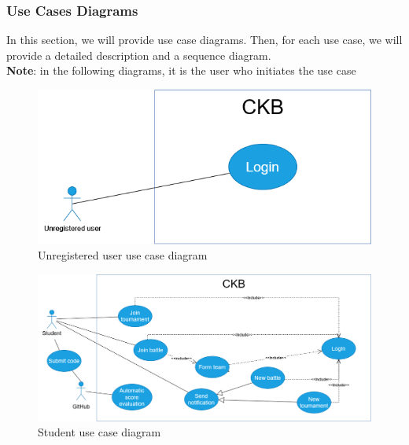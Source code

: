 \vspace{40pt}


\subsubsection{Use Cases Diagrams}
In this section, we will provide use case diagrams. Then, for each use case, we will provide a detailed description and a sequence diagram.
\\
\textbf{Note}: in the following diagrams, it is the user who initiates the use case

\vspace{3px}
\begin{figure}[H]
    \centering
    \includegraphics[scale=0.6]{src/uc_diagrams/unregistered_user.png}
    \caption{Unregistered user use case diagram}
\end{figure}

\vspace{3px}
\begin{figure}[H]
    \centering
    \includegraphics[width=\textwidth]{src/uc_diagrams/student.png}
    \caption{Student use case diagram}
\end{figure}

